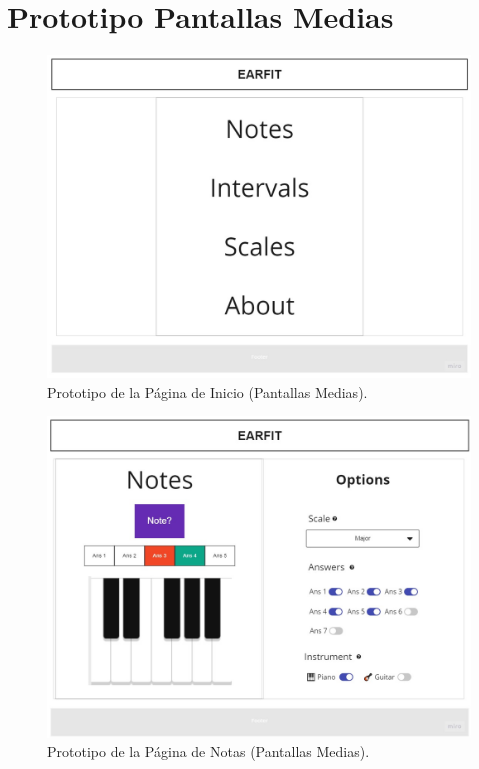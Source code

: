 \documentclass[12pt,twoside,titlepage]{report}
\begin{document}
\section{Prototipo Pantallas Medias}

\begin{figure}[H]
    \centering
    \includegraphics[scale=0.3]{Design Thinking/Prototipo/Medium/Menu}
    \caption{Prototipo de la Página de Inicio (Pantallas Medias).}
    \label{fig:Menu}
\end{figure}

\begin{figure}[H]
    \centering
    \includegraphics[scale=0.3]{Design Thinking/Prototipo/Medium/Notes}
    \caption{Prototipo de la Página de Notas (Pantallas Medias).}
    \label{fig:Notes}
\end{figure}
\end{document}
